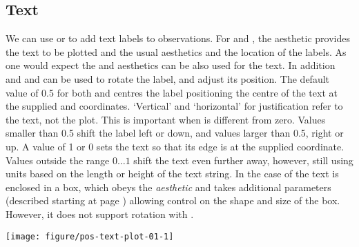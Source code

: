 \documentclass[krantz2]{krantz}\usepackage{knitr}%
\begin{document}
\subsection{Text}\label{sec:plot:text}
We can use  or  to add text labels to observations. For  and , the aesthetic  provides the text to be plotted and the usual aesthetics  and  the location of the labels. As one would expect the  and  aesthetics can be also used for the text. In addition  and  and  can be used to rotate the label, and adjust its position. The default value of 0.5 for both  and  centres the label positioning the centre of the text at the supplied  and  coordinates. `Vertical' and `horizontal' for justification refer to the text, not the plot. This is important when  is different from zero. Values smaller than 0.5 shift the label left or down, and values larger than 0.5, right or up. A value of 1 or 0 sets the text so that its edge is at the supplied coordinate. Values outside the range $0\ldots 1$ shift the text even further away, however, still using units based on the length or height of the text string. In the case of  the text is enclosed in a box, which obeys the  \emph{aesthetic} and takes additional parameters (described starting at page \pageref{start:plot:label}) allowing control on the shape and size of the box. However, it does not support rotation with .

\begin{knitrout}\footnotesize
{}\color{fgcolor}\begin{kframe}
\begin{alltt}
\hlstd{(}  \hlstd{(}   
                           \hlstd{=} 
                           
                            \hlopt{+}
  \hlstd{()} \hlopt{+}
  \hlstd{()} \hlopt{+}
  \hlstd{(} \hlstd{=} \hlstd{,}  \hlstd{=} \hlstd{)}
\end{alltt}
\end{kframe}

{\centering \texttt{[image: figure/pos-text-plot-01-1]} 

}



\end{knitrout}
\end{document}
